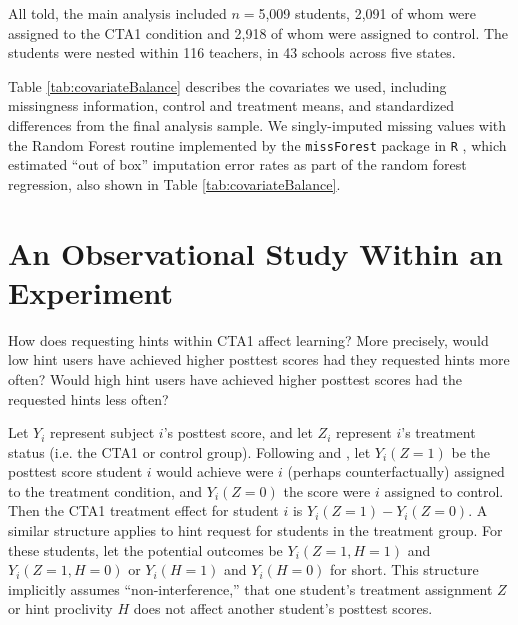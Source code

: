 \documentclass{article}\usepackage[]{graphicx}\usepackage[]{color}
\begin{document}
All told, the main analysis included $n=$5,009 students, 2,091 of whom were assigned to the CTA1 condition and 2,918 of whom were assigned to control.
The students were nested within 116 teachers, in 43 schools across five states.

Table \ref{tab:covariateBalance} describes the covariates we used, including
missingness information, control and treatment means, and standardized
differences \citep[c.f.][]{kalton1968standardization} from the final
analysis sample.
We singly-imputed missing values with the Random Forest routine implemented
by the \texttt{missForest} package in \texttt{R}
\citep{missForest,rcite},  which estimated ``out of box'' imputation
error rates as part of the random forest regression, also shown in Table \ref{tab:covariateBalance}.

\begin{table}[ht]
\centering

\caption{Missingness information, control (``BaU'' or ``Business as
  Usual'') and treatment (``CTA1'') means, and balance for the
  covariates included in this study, from the high school year two
  stratum of CTA1 Effectiveness experiment. Imputation error is percent falsely classified for
  categorical variables (Race/Ethnicity, Sex, and Special Education)
  and standardized root mean squared error for Pretest, which is
  continuous. %
  Analysis done in \texttt{R} via \texttt{RItools} \citep{ritools}.}
\label{tab:covariateBalance}
\end{table}


\section{An Observational Study Within an Experiment}\label{sec:observational}

How does requesting hints within CTA1 affect learning?
More precisely, would low hint users have achieved higher posttest scores
had they requested hints more often?
Would high hint users have achieved higher posttest scores had the
requested hints less often?

Let $Y_i$ represent subject $i$'s posttest score, and let $Z_i$ represent
$i$'s treatment status (i.e. the CTA1 or control group).
Following \citet{neyman} and \citet{rubin}, let $Y_i(Z=1)$ be
the posttest score student $i$ would achieve were $i$ (perhaps
counterfactually) assigned to the treatment condition, and
$Y_i(Z=0)$ the score were $i$ assigned to control.
Then the CTA1 treatment effect for student $i$ is $Y_i(Z=1)-Y_i(Z=0)$.
A similar structure applies to hint request for students in the
treatment group.
For these students, let the potential outcomes be $Y_i(Z=1,H=1)$ and
$Y_i(Z=1,H=0)$ or $Y_i(H=1)$ and $Y_i(H=0)$ for short.
This structure implicitly assumes ``non-interference,'' that one
student's treatment assignment $Z$ or hint proclivity $H$ does not
affect another student's posttest scores.
\end{document}

